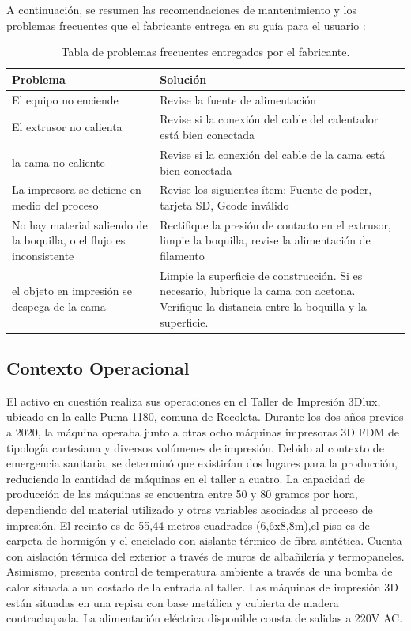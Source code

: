 A continuación, se resumen las recomendaciones de mantenimiento y los problemas frecuentes que el fabricante entrega en su guía para el usuario \parencite{germanreprap2019}:

\begin{table}[H]
  \centering
 
    \begin{tabular}{|p{9.215em}|p{19.645em}|}
	\hline    
    Problema & \multicolumn{1}{l}{Solución} \\
	\hline    
    El equipo no enciende & Revise la fuente de alimentación \\
	\hline    
    El extrusor no calienta & Revise si la conexión del cable del calentador está bien conectada \\
	\hline    
    la cama no caliente & Revise si la conexión del cable de la cama está bien conectada \\
	\hline    
    La impresora se detiene en medio del proceso & Revise los siguientes ítem: Fuente de poder, tarjeta SD, Gcode inválido \\
	\hline    
    No hay material saliendo de la boquilla, o el flujo es inconsistente & Rectifique la presión de contacto en el extrusor, limpie la boquilla, revise la alimentación de filamento \\
	\hline    
    el objeto en impresión se despega de la cama & Limpie la superficie de construcción. Si es necesario, lubrique la cama con acetona. Verifique la distancia entre la boquilla y la superficie.  \\
	\hline    
    \end{tabular}%
     \caption{Tabla de problemas frecuentes entregados por el fabricante.}
  \label{tab:addlabel}%
\end{table}%


\subsection{Contexto Operacional}

El activo en cuestión realiza sus operaciones en el Taller de Impresión 3Dlux, ubicado en la calle Puma 1180, comuna de Recoleta. Durante los dos años previos a 2020, la máquina operaba junto a otras ocho máquinas impresoras 3D FDM de tipología cartesiana y diversos volúmenes de impresión. Debido al contexto de emergencia sanitaria, se determinó que existirían dos lugares para la producción, reduciendo la cantidad de máquinas en el taller a cuatro. La capacidad de producción de las máquinas se encuentra entre 50 y 80 gramos por hora, dependiendo del material utilizado y otras variables asociadas al proceso de impresión. El recinto es de 55,44 metros cuadrados (6,6x8,8m),el piso  es de carpeta de hormigón y el encielado con aislante térmico de fibra sintética. Cuenta con aislación térmica del exterior a través de muros de albañilería y termopaneles. Asimismo, presenta control de temperatura ambiente a través de una bomba de calor situada a un costado de la entrada al taller. Las máquinas de impresión 3D están situadas en una repisa con base metálica y cubierta de madera contrachapada. La alimentación eléctrica disponible consta de salidas a 220V AC.

